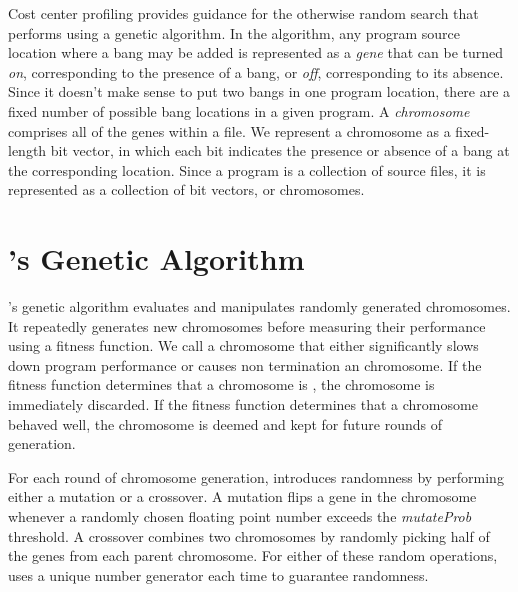 Cost center profiling provides guidance for the otherwise random
search that \Ao{} performs using a genetic algorithm. In the
algorithm, any program source location where a bang may be added is
represented as a \textit{gene} that can be turned \textit{on},
corresponding to the presence of a bang, or \textit{off},
corresponding to its absence. Since it doesn't make sense to put two
bangs in one program location, there are a fixed number of possible
bang locations in a given program. A \textit{chromosome} comprises all
of the genes within a file. We represent a chromosome as a
fixed-length bit vector, in which each bit indicates the presence or
absence of a bang at the corresponding location. Since a program is a
collection of source files, it is represented as a collection of bit
vectors, or chromosomes.


\section{\Ao{}'s Genetic Algorithm}

\Ao{}'s genetic algorithm evaluates and manipulates randomly generated
chromosomes. It repeatedly generates new chromosomes before measuring
their performance using a fitness function. We call a chromosome that
either significantly slows down program performance or causes non
termination an \textit{\unfit{}} chromosome. If the fitness function
determines that a chromosome is \unfit{}, the chromosome is
immediately discarded. If the fitness function determines that a
chromosome behaved well, the chromosome is deemed \textit{\fit{}} and
kept for future rounds of generation.

For each round of chromosome generation, \Ao{} introduces randomness
by performing either a mutation or a crossover. A mutation flips a
gene in the chromosome whenever a randomly chosen floating point
number exceeds the \textit{mutateProb} threshold. A crossover combines
two chromosomes by randomly picking half of the genes from each parent
chromosome. For either of these random operations, \Ao{} uses a unique
number generator each time to guarantee randomness.


